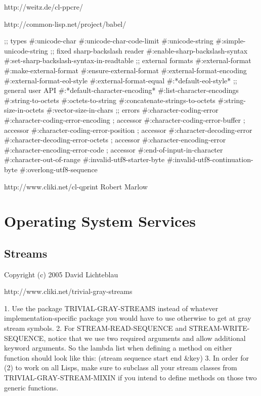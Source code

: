 \documentclass[10pt,english]{book}
\begin{document}
http://weitz.de/cl-ppcre/


http://common-lisp.net/project/babel/

   ;; types
   #:unicode-char
   #:unicode-char-code-limit
   #:unicode-string
   #:simple-unicode-string
   ;; fixed sharp-backslash reader
   #:enable-sharp-backslash-syntax
   #:set-sharp-backslash-syntax-in-readtable
   ;; external formats
   #:external-format
   #:make-external-format
   #:ensure-external-format
   #:external-format-encoding
   #:external-format-eol-style
   #:external-format-equal
   #:*default-eol-style*
   ;; general user API
   #:*default-character-encoding*
   #:list-character-encodings
   #:string-to-octets
   #:octets-to-string
   #:concatenate-strings-to-octets
   #:string-size-in-octets
   #:vector-size-in-chars
   ;; errors
   #:character-coding-error
   #:character-coding-error-encoding    ; accessor
   #:character-coding-error-buffer      ; accessor
   #:character-coding-error-position    ; accessor
   #:character-decoding-error
   #:character-decoding-error-octets    ; accessor
   #:character-encoding-error
   #:character-encoding-error-code      ; accessor
   #:end-of-input-in-character
   #:character-out-of-range
   #:invalid-utf8-starter-byte
   #:invalid-utf8-continuation-byte
   #:overlong-utf8-sequence


http://www.cliki.net/cl-qprint
Robert Marlow



\chapter{Operating System Services}
\label{cha:oper-syst-serv}

\section{Streams}
\label{sec:streams-1}

Copyright (c) 2005 David Lichteblau

http://www.cliki.net/trivial-gray-streams

1. Use the package TRIVIAL-GRAY-STREAMS instead of whatever
   implementation-specific package you would have to use otherwise to
   get at gray stream symbols.
2. For STREAM-READ-SEQUENCE and STREAM-WRITE-SEQUENCE, notice that we
   use two required arguments and allow additional keyword arguments.
   So the lambda list when defining a method on either function should look
   like this:
     (stream sequence start end \&key)
3. In order for (2) to work on all Lisps, make sure to subclass all your
   stream classes from TRIVIAL-GRAY-STREAM-MIXIN if you intend to define
   methods on those two generic functions.
\end{document}
